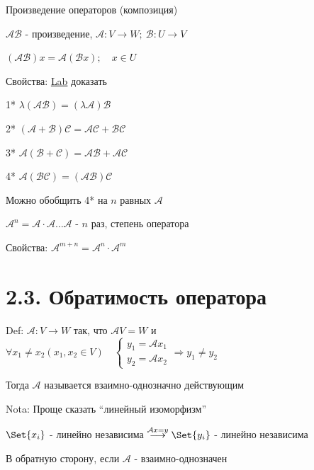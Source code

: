 \documentclass[12pt]{article}
\begin{document}
    \Def Произведение операторов (композиция)

    $\mathcal{A}\mathcal{B}$ - произведение, $\mathcal{A} : V \rightarrow W; \ \mathcal{B} : U \rightarrow V$

    $(\mathcal{A}\mathcal{B}) x = \mathcal{A}(\mathcal{B}x); \quad x \in U$

    Свойства: \underline{Lab} доказать

    1* $\lambda (\mathcal{A}\mathcal{B}) = (\lambda \mathcal{A})\mathcal{B}$

    2* $(\mathcal{A} + \mathcal{B}) \mathcal{C} = \mathcal{A}\mathcal{C} + \mathcal{B}\mathcal{C}$

    3* $\mathcal{A} (\mathcal{B} + \mathcal{C}) = \mathcal{A}\mathcal{B} + \mathcal{A}\mathcal{C}$

    4* $\mathcal{A} (\mathcal{B}\mathcal{C}) = (\mathcal{A}\mathcal{B}) \mathcal{C}$


    \Nota Можно обобщить 4* на $n$ равных $\mathcal{A}$

    \Def $\mathcal{A}^n = \mathcal{A} \cdot \mathcal{A} \dots \mathcal{A}$ - $n$ раз, степень оператора

    Свойства: $\mathcal{A}^{m + n} = \mathcal{A}^n \cdot \mathcal{A}^m$

    \section{2.3. Обратимость оператора}

    Def: $\mathcal{A} : V \rightarrow W$ так, что $\mathcal{A}V = W$ и $\forall x_1 \neq x_2 (x_1, x_2 \in V) \quad
    \begin{cases}y_1 = \mathcal{A}x_1 \\ y_2 = \mathcal{A}x_2\end{cases} \Longrightarrow y_1 \neq y_2$

    Тогда $\mathcal{A}$ называется взаимно-однозначно действующим

    Nota: Проще сказать \enquote{линейный изоморфизм}

    \Th $\Set{x_i}$ - линейно независима $\stackrel{\mathcal{A}x = y}{\longrightarrow} \Set{y_i}$ - линейно независима

    В обратную сторону, если $\mathcal{A}$ - взаимно-однозначен
\end{document}
